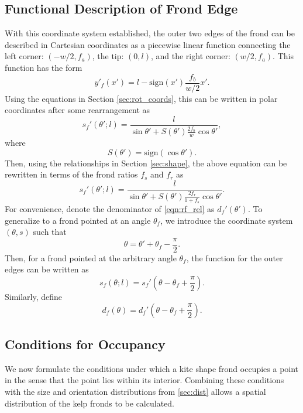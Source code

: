 \documentclass[ms,cpyr,lof,lot]{uathesis}
\newcommand{\sign}{\mbox{sign}}
\begin{document}
\subsection{Functional Description of Frond Edge}
With this coordinate system established, the outer two edges of the frond can be described in Cartesian coordinates as a piecewise linear function connecting the left corner: $(-w/2,f_a)$, the tip: $(0,l)$, and the right corner: $(w/2,f_a)$.
This function has the form
\begin{equation*}
	y'_f(x') = l-\sign(x')\frac{f_b}{w/2}x'.
\end{equation*}
Using the equations in Section \ref{sec:rot_coords}, this can be written in polar coordinates after some rearrangement as
\begin{equation*}
	s_f'(\theta';l) = \frac{l}{\sin\theta' + S(\theta')\frac{2f_b}{w}\cos\theta'},
\end{equation*}
where
\begin{equation*}
	S(\theta') = \sign(\cos\theta').
\end{equation*}
Then, using the relationships in Section \ref{sec:shape}, the above equation can be rewritten in terms of the frond ratios $f_s$ and $f_r$ as
\begin{equation}
	\label{eqn:rf_rel}
	s_f'(\theta';l) = \frac{l}{\sin\theta' + S(\theta')\frac{2f_r}{1+f_s}\cos\theta'}.
\end{equation}
For convenience, denote the denominator of \eqref{eqn:rf_rel} as $d_f'(\theta')$.
To generalize to a frond pointed at an angle $\theta_f$, we introduce the coordinate system $(\theta,s)$ such that
\begin{equation*}
	\theta = \theta' + \theta_f - \frac{\pi}{2}.
\end{equation*}
Then, for a frond pointed at the arbitrary angle $\theta_f$, the function for the outer edges can be written as
\begin{equation}
	\label{eqn:rf_abs}
	s_f(\theta;l) = s_f'\left(\theta - \theta_f + \frac{\pi}{2} \right).
\end{equation}
Similarly, define
\begin{equation}
	d_f(\theta) = d_f'\left(\theta - \theta_f + \frac{\pi}{2} \right).
\end{equation}

\subsection{Conditions for Occupancy}
We now formulate the conditions under which a kite shape frond occupies a point
in the sense that the point lies within its interior.
Combining these conditions with the size and orientation distributions from \ref{sec:dist}
allows a spatial distribution of the kelp fronds to be calculated.
\end{document}
